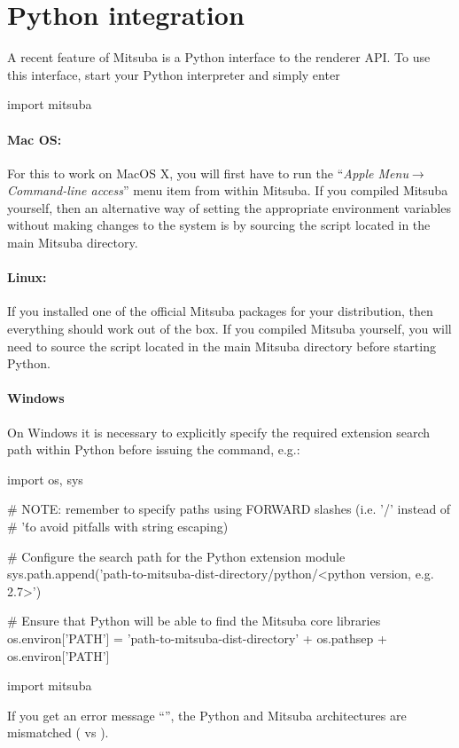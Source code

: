 \section{Python integration}
\label{sec:python}
A recent feature of Mitsuba is a Python interface to the renderer API.
To use this interface, start your Python interpreter and simply enter
\begin{python}
import mitsuba
\end{python}
\paragraph{Mac OS:}
For this to work on MacOS X, you will first have to run the ``\emph{Apple
Menu}$\to$\emph{Command-line access}'' menu item from within Mitsuba.
If you compiled Mitsuba yourself, then an alternative way of setting the appropriate
environment variables without making changes to the system is by sourcing the
 script located in the main Mitsuba directory.

\paragraph{Linux:}
If you installed one of the official Mitsuba packages for your distribution, then everything should work out of the box.
If you compiled Mitsuba yourself, you will need to source the
 script located in the main Mitsuba directory before starting Python.

\paragraph{Windows}
On Windows it is necessary to explicitly specify the required extension search path within Python
before issuing the  command, e.g.:
\begin{python}
import os, sys

# NOTE: remember to specify paths using FORWARD slashes (i.e. '/' instead of
# '\' to avoid pitfalls with string escaping)

# Configure the search path for the Python extension module
sys.path.append('path-to-mitsuba-dist-directory/python/<python version, e.g. 2.7>')

# Ensure that Python will be able to find the Mitsuba core libraries
os.environ['PATH'] = 'path-to-mitsuba-dist-directory' + os.pathsep + os.environ['PATH']

import mitsuba
\end{python}
If you get an error message ``'',
    the Python and Mitsuba architectures are mismatched ( vs ).

